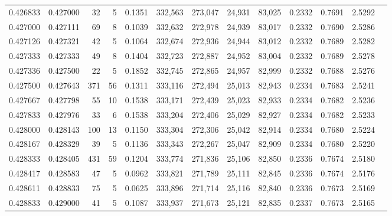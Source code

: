\begin{tabular}{rrrrrrrrrrrrr}
0.426833 & 0.427000 &    32 &   5 &                                     0.1351 & 332,563 & 273,047 &  24,931 &  83,025 & 0.2332 & 0.7691 & 2.5292 \\
0.427000 & 0.427111 &    69 &   8 &                                     0.1039 & 332,632 & 272,978 &  24,939 &  83,017 & 0.2332 & 0.7690 & 2.5286 \\
0.427126 & 0.427321 &    42 &   5 &                                     0.1064 & 332,674 & 272,936 &  24,944 &  83,012 & 0.2332 & 0.7689 & 2.5282 \\
0.427333 & 0.427333 &    49 &   8 &                                     0.1404 & 332,723 & 272,887 &  24,952 &  83,004 & 0.2332 & 0.7689 & 2.5278 \\
0.427336 & 0.427500 &    22 &   5 &                                     0.1852 & 332,745 & 272,865 &  24,957 &  82,999 & 0.2332 & 0.7688 & 2.5276 \\
0.427500 & 0.427643 &   371 &  56 &                                     0.1311 & 333,116 & 272,494 &  25,013 &  82,943 & 0.2334 & 0.7683 & 2.5241 \\
0.427667 & 0.427798 &    55 &  10 &                                     0.1538 & 333,171 & 272,439 &  25,023 &  82,933 & 0.2334 & 0.7682 & 2.5236 \\
0.427833 & 0.427976 &    33 &   6 &                                     0.1538 & 333,204 & 272,406 &  25,029 &  82,927 & 0.2334 & 0.7682 & 2.5233 \\
0.428000 & 0.428143 &   100 &  13 &                                     0.1150 & 333,304 & 272,306 &  25,042 &  82,914 & 0.2334 & 0.7680 & 2.5224 \\
0.428167 & 0.428329 &    39 &   5 &                                     0.1136 & 333,343 & 272,267 &  25,047 &  82,909 & 0.2334 & 0.7680 & 2.5220 \\
0.428333 & 0.428405 &   431 &  59 &                                     0.1204 & 333,774 & 271,836 &  25,106 &  82,850 & 0.2336 & 0.7674 & 2.5180 \\
0.428417 & 0.428583 &    47 &   5 &                                     0.0962 & 333,821 & 271,789 &  25,111 &  82,845 & 0.2336 & 0.7674 & 2.5176 \\
0.428611 & 0.428833 &    75 &   5 &                                     0.0625 & 333,896 & 271,714 &  25,116 &  82,840 & 0.2336 & 0.7673 & 2.5169 \\
0.428833 & 0.429000 &    41 &   5 &                                     0.1087 & 333,937 & 271,673 &  25,121 &  82,835 & 0.2337 & 0.7673 & 2.5165 \\

\end{tabular}
